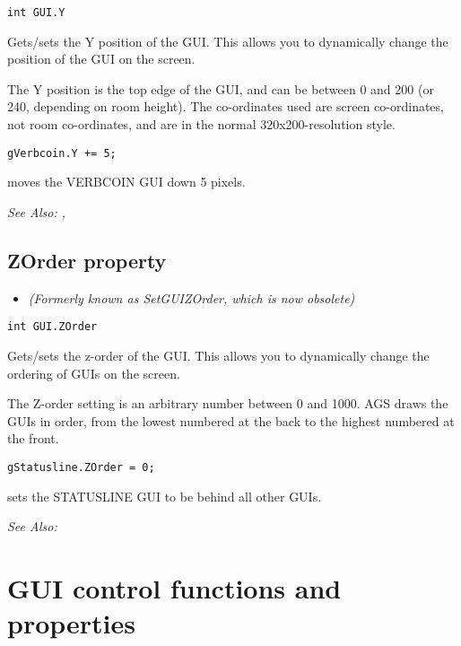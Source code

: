 \begin{verbatim}
int GUI.Y
\end{verbatim}
Gets/sets the Y position of the GUI. This allows you to dynamically change the position
of the GUI on the screen.

The Y position is the top edge of the GUI, and can be between 0 and 200 (or 240, depending
on room height). The co-ordinates used are screen co-ordinates, not room co-ordinates,
and are in the normal 320x200-resolution style.

\begin{verbatim}
gVerbcoin.Y += 5;
\end{verbatim}

moves the VERBCOIN GUI down 5 pixels.

\it{See Also:} , 


\subsection{ZOrder property}\label{GUI.ZOrder}%

\begin{itemize}
\item \it{(Formerly known as SetGUIZOrder, which is now obsolete)}
\end{itemize}

\begin{verbatim}
int GUI.ZOrder
\end{verbatim}
Gets/sets the z-order of the GUI. This allows you to dynamically change the ordering
of GUIs on the screen.

The Z-order setting is an arbitrary number between 0 and 1000. AGS draws the GUIs
in order, from the lowest numbered at the back to the highest numbered at the front.

\begin{verbatim}
gStatusline.ZOrder = 0;
\end{verbatim}

sets the STATUSLINE GUI to be behind all other GUIs.

\it{See Also:} 




\section{GUI control functions and properties}

